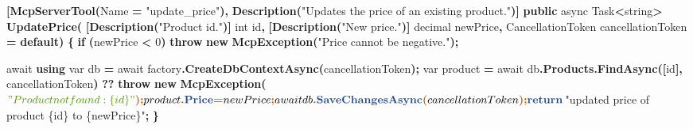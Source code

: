 \documentclass[
  italian,
  10pt,
]{book}
\newenvironment{Shaded}{\begin{snugshade}}{\end{snugshade}}
\newcommand{\DataTypeTok}[1]{\textcolor[rgb]{0.13,0.29,0.53}{#1}}
\newcommand{\DecValTok}[1]{\textcolor[rgb]{0.00,0.00,0.81}{#1}}
\newcommand{\FunctionTok}[1]{\textcolor[rgb]{0.13,0.29,0.53}{\textbf{#1}}}
\newcommand{\KeywordTok}[1]{\textcolor[rgb]{0.13,0.29,0.53}{\textbf{#1}}}
\newcommand{\NormalTok}[1]{#1}
\newcommand{\OperatorTok}[1]{\textcolor[rgb]{0.81,0.36,0.00}{\textbf{#1}}}
\newcommand{\StringTok}[1]{\textcolor[rgb]{0.31,0.60,0.02}{#1}}
\begin{document}
\begin{Shaded}
\begin{Highlighting}[]
    \OperatorTok{[}\FunctionTok{McpServerTool}\OperatorTok{(}\NormalTok{Name }\OperatorTok{=} \StringTok{"update\_price"}\OperatorTok{),} \FunctionTok{Description}\OperatorTok{(}\StringTok{"Updates the price of an existing product."}\OperatorTok{)]}
    \KeywordTok{public}\NormalTok{ async Task}\OperatorTok{\textless{}}\DataTypeTok{string}\OperatorTok{\textgreater{}} \FunctionTok{UpdatePrice}\OperatorTok{(}
        \OperatorTok{[}\FunctionTok{Description}\OperatorTok{(}\StringTok{"Product id."}\OperatorTok{)]} \DataTypeTok{int}\NormalTok{ id}\OperatorTok{,}
        \OperatorTok{[}\FunctionTok{Description}\OperatorTok{(}\StringTok{"New price."}\OperatorTok{)]} \DataTypeTok{decimal}\NormalTok{ newPrice}\OperatorTok{,}
\NormalTok{        CancellationToken cancellationToken }\OperatorTok{=} \KeywordTok{default}\OperatorTok{)}
    \OperatorTok{\{}
        \KeywordTok{if} \OperatorTok{(}\NormalTok{newPrice }\OperatorTok{\textless{}} \DecValTok{0}\OperatorTok{)}
            \KeywordTok{throw} \KeywordTok{new} \FunctionTok{McpException}\OperatorTok{(}\StringTok{"Price cannot be negative."}\OperatorTok{);}

\NormalTok{        await }\KeywordTok{using} \DataTypeTok{var}\NormalTok{ db }\OperatorTok{=}\NormalTok{ await factory}\OperatorTok{.}\FunctionTok{CreateDbContextAsync}\OperatorTok{(}\NormalTok{cancellationToken}\OperatorTok{);}
        \DataTypeTok{var}\NormalTok{ product }\OperatorTok{=}\NormalTok{ await db}\OperatorTok{.}\FunctionTok{Products}\OperatorTok{.}\FunctionTok{FindAsync}\OperatorTok{([}\NormalTok{id}\OperatorTok{],}\NormalTok{ cancellationToken}\OperatorTok{)}
            \OperatorTok{??} \KeywordTok{throw} \KeywordTok{new} \FunctionTok{McpException}\OperatorTok{(}\NormalTok{$}\StringTok{"Product not found: \{id\}"}\OperatorTok{);}
\NormalTok{        product}\OperatorTok{.}\FunctionTok{Price} \OperatorTok{=}\NormalTok{ newPrice}\OperatorTok{;}
\NormalTok{        await db}\OperatorTok{.}\FunctionTok{SaveChangesAsync}\OperatorTok{(}\NormalTok{cancellationToken}\OperatorTok{);}
        \KeywordTok{return}\NormalTok{ $}\StringTok{"updated price of product \{id\} to \{newPrice\}"}\OperatorTok{;}
    \OperatorTok{\}}


\end{Highlighting}
\end{Shaded}
\end{document}
